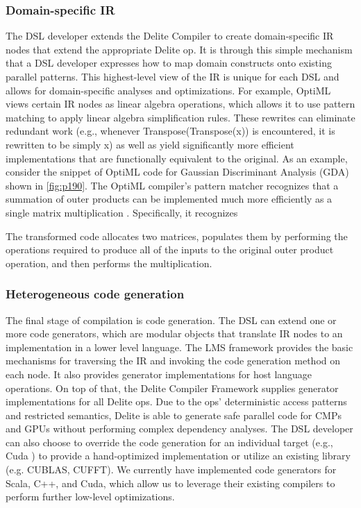 \subsubsection{Domain-specific IR}

The DSL developer extends the Delite Compiler to create
domain-specific IR nodes that extend the appropriate Delite
op. It is through this simple mechanism that a DSL developer expresses how to map domain constructs onto existing parallel patterns. This highest-level view of the IR is
unique for each DSL and allows for domain-specific analyses
and optimizations. For example, OptiML views certain IR
nodes as linear algebra operations, which allows it to use
pattern matching to apply linear algebra simplification rules.
These rewrites can eliminate redundant work (e.g., whenever
Transpose(Transpose(x)) is encountered, it is rewritten to be
simply x) as well as yield significantly more efficient implementations that are functionally equivalent to the original. As
an example, consider the snippet of OptiML code for Gaussian
Discriminant Analysis (GDA) shown in \ref{fig:p190}. The OptiML compiler’s pattern matcher recognizes that a summation of
outer products can be implemented much more efficiently as
a single matrix multiplication \cite{sujeeth2011optiml}. Specifically, it recognizes



The transformed code allocates two matrices, populates
them by performing the operations required to produce all
of the inputs to the original outer product operation, and then
performs the multiplication.



\subsubsection{Heterogeneous code generation}
The final stage of compilation is code generation. The
DSL can extend one or more code generators, which are
modular objects that translate IR nodes to an implementation
in a lower level language. The LMS framework provides the
basic mechanisms for traversing the IR and invoking the code
generation method on each node. It also provides generator
implementations for host language operations. On top of that,
the Delite Compiler Framework supplies generator implementations for all Delite ops. Due to the ops’ deterministic access
patterns and restricted semantics, Delite is able to generate
safe parallel code for CMPs and GPUs without performing
complex dependency analyses. The DSL developer can also
choose to override the code generation for an individual target
(e.g., Cuda \cite{CUDAZone76:online}) to provide a hand-optimized implementation
or utilize an existing library (e.g. CUBLAS, CUFFT). We
currently have implemented code generators for Scala, C++,
and Cuda, which allow us to leverage their existing compilers
to perform further low-level optimizations.


